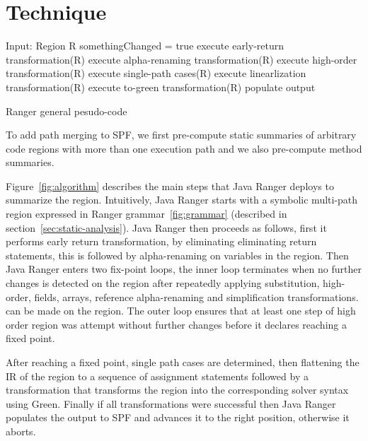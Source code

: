\section{Technique}
%

\begin{algorithm}[]
\SetAlgoLined
Input: Region R\;
 somethingChanged = true\;
 execute early-return transformation(R)\;
 execute alpha-renaming transformation(R)\;
 {
	execute high-order transformation(R)\;}
	execute single-path cases(R)\;
	execute linearlization transformation(R)\;
	execute to-green transformation(R)\;
	populate output\;
 \label{fig:algorithm}
  \caption{Ranger general pesudo-code}
\end{algorithm}

%
To add path merging to SPF, we first pre-compute static summaries of arbitrary code regions with more than one execution
path and we also pre-compute method summaries. 

Figure~\ref{fig:algorithm} describes the main steps that Java Ranger deploys to summarize the region. Intuitively, Java Ranger starts with a symbolic multi-path region expressed in Ranger grammar~\ref{fig:grammar} (described in section~\ref{sec:static-analysis}). Java Ranger then proceeds as follows, first it performs early return transformation, by eliminating eliminating return statements, this is followed by alpha-renaming on variables in the region. Then Java Ranger enters two fix-point loops, the inner loop terminates when no further changes is detected on the region after repeatedly applying substitution, high-order, fields, arrays, reference alpha-renaming and simplification transformations. can be made on the region. The outer loop ensures that at least one step of high order region was attempt without further changes before it declares reaching a fixed point. 

After reaching a fixed point, single path cases are determined, then flattening the IR of the region to a sequence of assignment statements followed by a transformation that transforms the region into the corresponding solver syntax using Green. Finally if all transformations were successful then Java Ranger populates the output to SPF and advances it to the right position, otherwise it aborts. 

